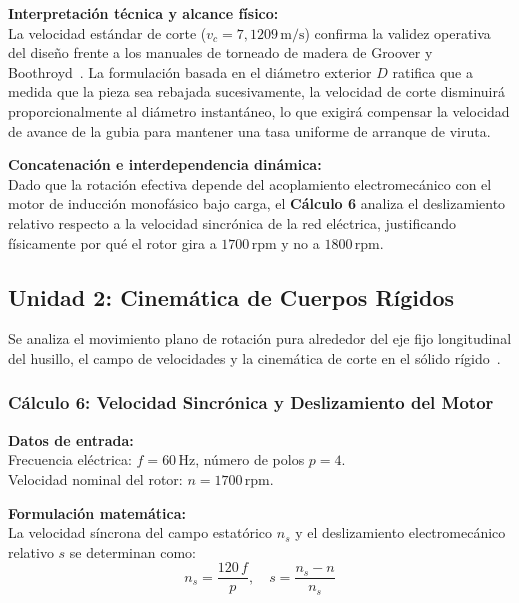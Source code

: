 \documentclass[12pt,a4paper]{article}
\begin{document}
\noindent\textbf{Interpretación técnica y alcance físico:}\\
La velocidad estándar de corte ($v_c = 7{,}1209\,\text{m/s}$) confirma la validez operativa del diseño frente a los manuales de torneado de madera de Groover y Boothroyd~\cite{groover2007, boothroyd2006}. La formulación basada en el diámetro exterior $D$ ratifica que a medida que la pieza sea rebajada sucesivamente, la velocidad de corte disminuirá proporcionalmente al diámetro instantáneo, lo que exigirá compensar la velocidad de avance de la gubia para mantener una tasa uniforme de arranque de viruta.

\noindent\textbf{Concatenación e interdependencia dinámica:}\\
Dado que la rotación efectiva depende del acoplamiento electromecánico con el motor de inducción monofásico bajo carga, el \textbf{Cálculo 6} analiza el deslizamiento relativo respecto a la velocidad sincrónica de la red eléctrica, justificando físicamente por qué el rotor gira a $1700\,\text{rpm}$ y no a $1800\,\text{rpm}$.

\subsection{Unidad 2: Cinemática de Cuerpos Rígidos}
Se analiza el movimiento plano de rotación pura alrededor del eje fijo longitudinal del husillo, el campo de velocidades y la cinemática de corte en el sólido rígido~\cite{beer2017, shabana2013, nikravesh1988}.

\subsubsection{Cálculo 6: Velocidad Sincrónica y Deslizamiento del Motor}

\noindent\textbf{Datos de entrada:}\\
Frecuencia eléctrica: $f = 60\,\text{Hz}$, número de polos $p = 4$.\\
Velocidad nominal del rotor: $n = 1700\,\text{rpm}$.
\vspace{6pt}

\noindent\textbf{Formulación matemática:}\\
La velocidad síncrona del campo estatórico $n_s$ y el deslizamiento electromecánico relativo $s$ se determinan como:
\begin{equation}
    n_s = \frac{120 \, f}{p}, \quad s = \frac{n_s - n}{n_s}
\end{equation}
\vspace{6pt}
\end{document}
